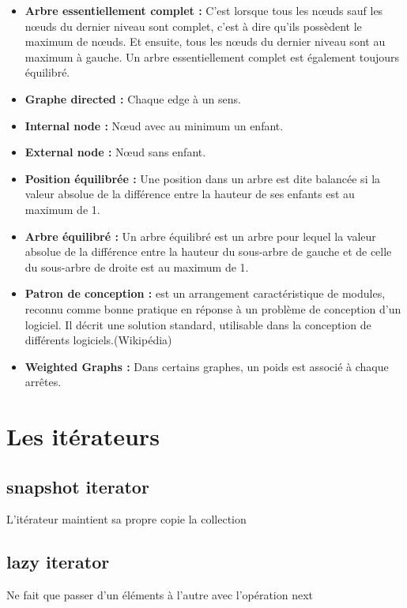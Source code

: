 \documentclass[a4paper]{article}
\begin{document}
\begin{itemize}
\item \textbf{Arbre essentiellement complet : } C'est lorsque tous les nœuds sauf les nœuds du dernier niveau sont complet, c'est à dire qu'ils possèdent le maximum de nœuds. Et ensuite, tous les nœuds du dernier niveau sont au maximum à gauche. Un arbre essentiellement complet est également toujours équilibré.

\item \textbf{Graphe directed : } Chaque edge à un sens.

\item \textbf{Internal node : } Nœud avec au minimum un enfant.

\item \textbf{External node : } Nœud sans enfant.

\item \textbf{Position équilibrée : } Une position dans un arbre est dite balancée si la valeur absolue de la différence entre la hauteur de ses enfants est au maximum de 1.

\item \textbf{Arbre équilibré : } Un arbre équilibré est un arbre pour lequel la valeur absolue de la différence entre la hauteur du sous-arbre de gauche et de celle du sous-arbre de droite est au maximum de 1.

\item \textbf{Patron de conception : } est un arrangement caractéristique de modules, reconnu comme bonne pratique en réponse à un problème de conception d'un logiciel. Il décrit une solution standard, utilisable dans la conception de différents logiciels.(Wikipédia)

\item \textbf{Weighted Graphs : } Dans certains graphes, un poids est associé à chaque arrêtes.
\end{itemize}

\section{Les itérateurs}
\subsection{snapshot iterator}
L'itérateur maintient sa propre copie la collection
\subsection{lazy iterator}
Ne fait que passer d'un éléments à l'autre avec l'opération next
\end{document}
